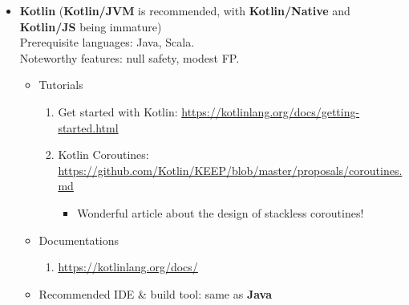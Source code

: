 \documentclass{article}
\begin{document}
\begin{itemize}
    \item \textbf{Kotlin}
    (\textbf{Kotlin/JVM} is recommended, with \textbf{Kotlin/Native} and \textbf{Kotlin/JS} being immature)\\
    Prerequisite languages: Java, Scala.\\
    Noteworthy features: null safety, modest FP.
    \begin{itemize}
        \item Tutorials
        \begin{enumerate}
            \item Get started with Kotlin:
            \href{https://kotlinlang.org/docs/getting-started.html}{https://kotlinlang.org/docs/getting-started.html}
            \item Kotlin Coroutines:\\
            \href{https://github.com/Kotlin/KEEP/blob/master/proposals/coroutines.md}{https://github.com/Kotlin/KEEP/blob/master/proposals/coroutines.md}
            \begin{itemize}
                \item Wonderful article about the design of stackless coroutines!
            \end{itemize}
        \end{enumerate}
        \item Documentations
        \begin{enumerate}
            \item        \href{https://kotlinlang.org/docs/}{https://kotlinlang.org/docs/}
        \end{enumerate}
        \item Recommended IDE \& build tool: same as \textbf{Java}
    \end{itemize}
    

\end{itemize}
\end{document}
